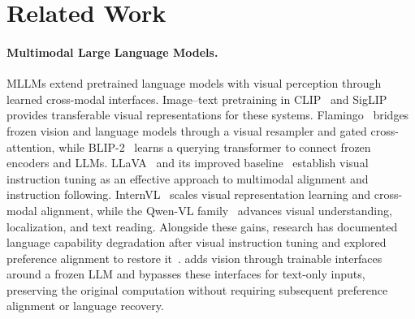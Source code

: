 \section{Related Work}
\label{sec:related}

\paragraph{Multimodal Large Language Models.}
MLLMs extend pretrained language models with visual perception through
learned cross-modal interfaces. Image--text pretraining in
CLIP~\citep{radford2021clip} and SigLIP~\citep{zhai2023siglip} provides
transferable visual representations for these systems.
Flamingo~\citep{alayrac2022flamingo} bridges frozen vision and language
models through a visual resampler and gated cross-attention, while
BLIP-2~\citep{li2023blip2} learns a querying transformer to connect frozen
encoders and LLMs. LLaVA~\citep{liu2023llava} and its improved
baseline~\citep{liu2024improved} establish visual instruction tuning as an
effective approach to multimodal alignment and instruction following.
InternVL~\citep{chen2024internvl} scales visual representation learning and
cross-modal alignment, while the Qwen-VL
family~\citep{bai2023qwenvl,bai2025qwen25vl,bai2025qwen3vl} advances visual
understanding, localization, and text reading. Alongside these gains,
research has documented language capability degradation after visual
instruction tuning and explored preference alignment to restore
it~\citep{li2024multimodalpreference}.
\modelname{} adds vision through trainable interfaces around a frozen LLM
and bypasses these interfaces for text-only inputs, preserving the
original computation without requiring subsequent preference alignment
or language recovery.


